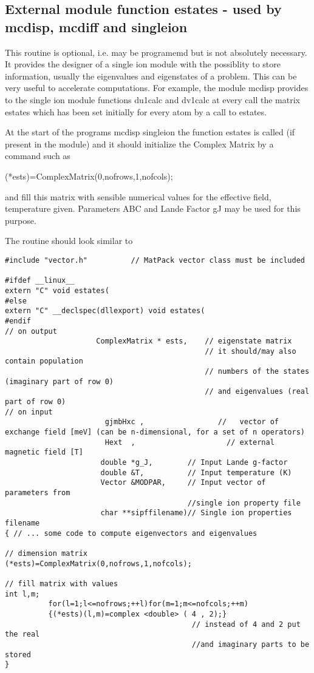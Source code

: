 \subsection{External module function {\prg estates} - used by {\prg mcdisp}, {\prg %
mcdiff} and {\prg singleion}}

This routine is optional, i.e. may be programemd but is not absolutely necessary. It provides the designer of a %
single ion module
with the possiblity to store information, usually the eigenvalues and eigenstates of a problem. This can be very %
useful to accelerate computations. 
For example, the module {\prg mcdisp} provides to the single ion module functions {\prg du1calc} and {\prg dv1calc}
at every call the matrix {\prg estates} which has been set initially for every atom
by a call to {\prg estates}.

At the start of the programs {\prg mcdisp} {\prg singleion} the function {\prg estates}
is called (if present in the module) and it should initialize the Complex Matrix by a command such as

{\prg (*ests)=ComplexMatrix(0,nofrows,1,nofcols);} 

and fill this matrix with sensible numerical values for the effective field, temperature given.
Parameters {\prg ABC} and Lande Factor {\prg gJ} may be used for this purpose. 

The routine should look similar to
{\footnotesize
\begin{verbatim}
#include "vector.h"          // MatPack vector class must be included

#ifdef __linux__
extern "C" void estates(
#else
extern "C" __declspec(dllexport) void estates(
#endif
// on output
                     ComplexMatrix * ests,    // eigenstate matrix      
                                              // it should/may also contain population 
                                              // numbers of the states (imaginary part of row 0)
                                              // and eigenvalues (real part of row 0)
// on input
                       gjmbHxc ,                 //   vector of exchange field [meV] (can be n-dimensional, for a set of n operators)
                       Hext  ,                     // external magnetic field [T]
                      double *g_J,        // Input Lande g-factor
                      double &T,          // Input temperature (K)
                      Vector &MODPAR,     // Input vector of parameters from 
					                      //single ion property file
                      char **sipffilename)// Single ion properties filename                      
{ // ... some code to compute eigenvectors and eigenvalues

// dimension matrix
(*ests)=ComplexMatrix(0,nofrows,1,nofcols);

// fill matrix with values
int l,m;
          for(l=1;l<=nofrows;++l)for(m=1;m<=nofcols;++m)
          {(*ests)(l,m)=complex <double> ( 4 , 2);}
                                           // instead of 4 and 2 put the real 
										   //and imaginary parts to be stored
}
\end{verbatim}
}


